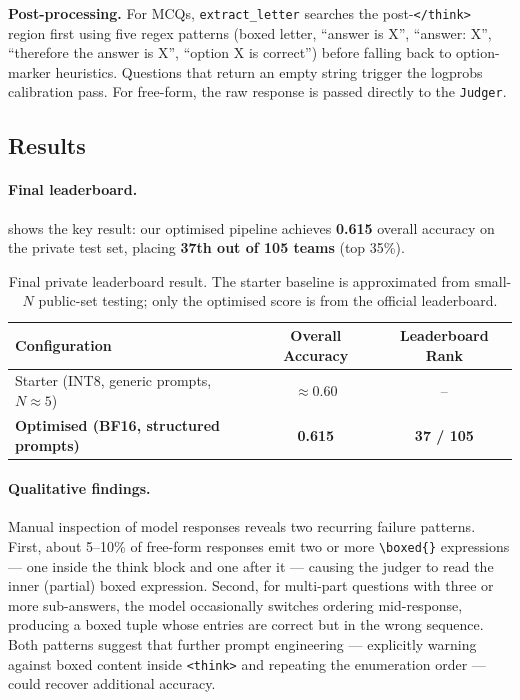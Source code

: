 \documentclass{article}
\begin{document}
\textbf{Post-processing.}
For MCQs, \texttt{extract\_letter} searches the post-\texttt{</think>}
region first using five regex patterns (boxed letter, ``answer is X'',
``answer: X'', ``therefore the answer is X'', ``option X is correct'')
before falling back to option-marker heuristics.
Questions that return an empty string trigger the logprobs calibration pass.
For free-form, the raw response is passed directly to the \texttt{Judger}.

\subsection{Results}
\label{sec:results}

\paragraph{Final leaderboard.}
 shows the key result: our optimised pipeline
achieves \textbf{0.615} overall accuracy on the private test set, placing
\textbf{37th out of 105 teams} (top 35\%).

\begin{table}[h]
  \caption{Final private leaderboard result.  The starter baseline is
    approximated from small-$N$ public-set testing; only the optimised score
    is from the official leaderboard.}
  \label{tab:final-results}
  \centering
  \begin{tabular}{lcc}
    \toprule
    Configuration & Overall Accuracy & Leaderboard Rank \\
    \midrule
    Starter (INT8, generic prompts, $N{\approx}5$) & $\approx$0.60 & -- \\
    \textbf{Optimised (BF16, structured prompts)} & \textbf{0.615} & \textbf{37 / 105} \\
    \bottomrule
  \end{tabular}
\end{table}

\paragraph{Qualitative findings.}
Manual inspection of model responses reveals two recurring failure patterns.
First, about 5--10\% of free-form responses emit two or more
\texttt{\textbackslash boxed\{\}} expressions — one inside the think block
and one after it — causing the judger to read the inner (partial) boxed
expression.
Second, for multi-part questions with three or more sub-answers, the model
occasionally switches ordering mid-response, producing a boxed tuple whose
entries are correct but in the wrong sequence.
Both patterns suggest that further prompt engineering — explicitly warning
against boxed content inside \texttt{<think>} and repeating the enumeration
order — could recover additional accuracy.
\end{document}
